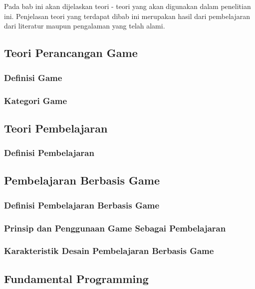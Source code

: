 \chapter{\babDua}
Pada bab ini akan dijelaskan teori - teori yang akan digunakan \saya dalam penelitian ini. Penjelasan teori yang terdapat dibab ini merupakan hasil dari pembelajaran \saya dari literatur maupun pengalaman yang telah \saya alami.
\section{Teori Perancangan Game}
	\subsection{Definisi Game}
	\subsection{Kategori Game}
	
\section{Teori Pembelajaran}
	\subsection{Definisi Pembelajaran}
	
\section{Pembelajaran Berbasis Game}
	\subsection{Definisi Pembelajaran Berbasis Game}
	\subsection{Prinsip dan Penggunaan Game Sebagai Pembelajaran}
	\subsection{Karakteristik Desain Pembelajaran Berbasis Game}
	
\section{Fundamental Programming}

